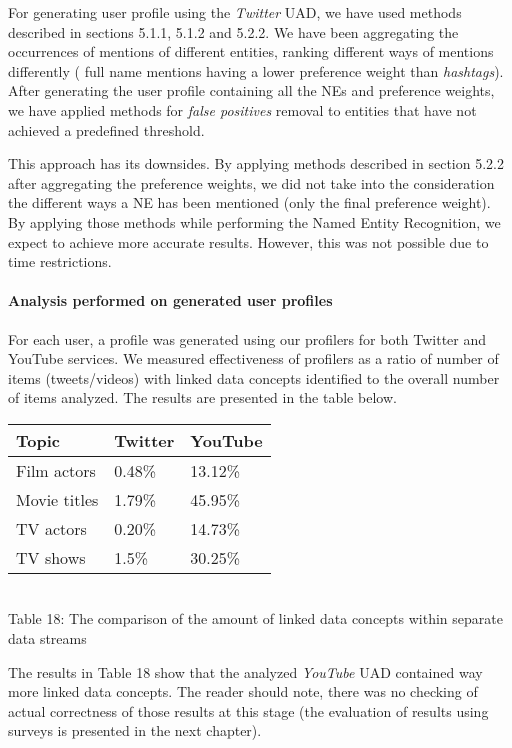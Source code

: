 For generating user profile using the \textit{Twitter} UAD, we have used methods
described in sections 5.1.1, 5.1.2 and 5.2.2. We have been aggregating the occurrences
of mentions of different entities, ranking different ways of mentions differently (\eg
full name mentions having a lower preference weight than \textit{hashtags}). After
generating the user profile containing all the NEs and preference weights, we have
applied methods for \textit{false positives} removal to entities that have not achieved
a predefined threshold.

This approach has its downsides. By applying methods described in section 5.2.2 after
aggregating the preference weights, we did not take into the consideration the different
ways a NE has been mentioned (only the final preference weight).
By applying those methods while performing the Named Entity Recognition, we expect to
achieve more accurate results. However, this was not possible due to time restrictions.

\paragraph{Analysis performed on generated user profiles}

For each user, a profile was generated using our profilers for both Twitter and
YouTube services. We measured effectiveness of profilers as a ratio of number of
items (tweets/videos) with linked data concepts identified to the overall number
of items analyzed. The results are presented in the table below.

\begin{center}
  \begin{tabular}{| l | l | l |}
  Topic & Twitter & YouTube \\ \hline
  Film actors & 0.48\% & 13.12\% \\
  Movie titles & 1.79\% & 45.95\% \\
  TV actors & 0.20\% & 14.73\% \\
  TV shows & 1.5\% & 30.25\% \\
  \end{tabular} \\
  Table 18: The comparison of the amount of linked data concepts within separate data streams \\
\end{center}

The results in Table 18 show that the analyzed \textit{YouTube} UAD contained way more linked
data concepts. The reader should note, there was no checking of actual correctness of those results at
this stage (the evaluation of results using surveys is presented in the next chapter).


